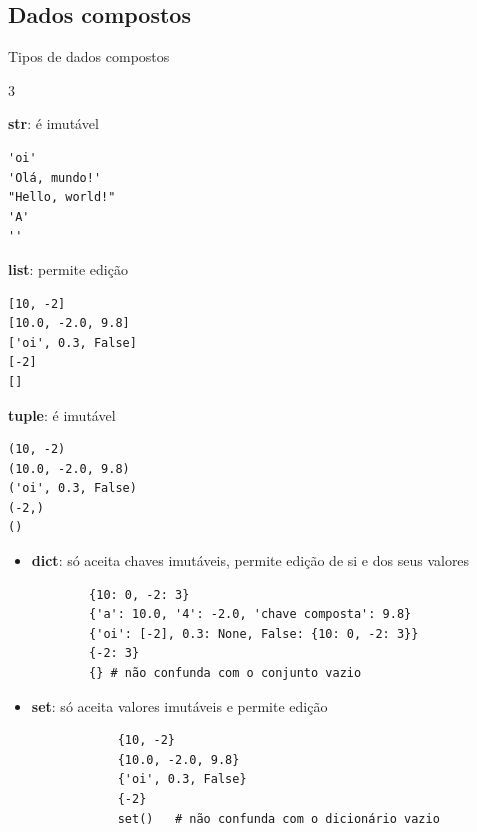 \subsection{Dados compostos} 
\begin{frame}[containsverbatim]{Tipos de dados compostos}%
	\begin{itemize}%
	\end{itemize}	
  \end{frame}
  
\begin{frame}[containsverbatim]			
\begin{itemize}	
\item \textbf{dict}: 
	{\color{red} só aceita chaves imutáveis}, 
	permite edição de si e dos seus valores 
	\begin{verbatim}
		{10: 0, -2: 3}
		{'a': 10.0, '4': -2.0, 'chave composta': 9.8}
		{'oi': [-2], 0.3: None, False: {10: 0, -2: 3}}
		{-2: 3}
		{} # não confunda com o conjunto vazio
	\end{verbatim} 
\end{itemize}
\end{frame}  

\begin{frame}[containsverbatim]			
	\begin{itemize}		
		\item \textbf{set}: 
		{\color{red} só aceita valores imutáveis}  
		e permite edição 
		\begin{verbatim}
			{10, -2}
			{10.0, -2.0, 9.8}
			{'oi', 0.3, False}
			{-2}
			set()	# não confunda com o dicionário vazio
		\end{verbatim}
	\end{itemize}
\end{frame}

